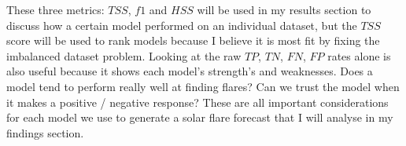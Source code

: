 These three metrics: $TSS$, $f1$ and $HSS$ will be used in my results section to discuss how a certain model performed on an individual dataset, but the $TSS$ score will be used to rank models because I believe it is most fit by fixing the imbalanced dataset problem. Looking at the raw $TP$, $TN$, $FN$, $FP$ rates alone is also useful because it shows each model's strength's and weaknesses. Does a model tend to perform really well at finding flares? Can we trust the model when it makes a positive / negative response? These are all important considerations for each model we use to generate a solar flare forecast that I will analyse in my findings section.
